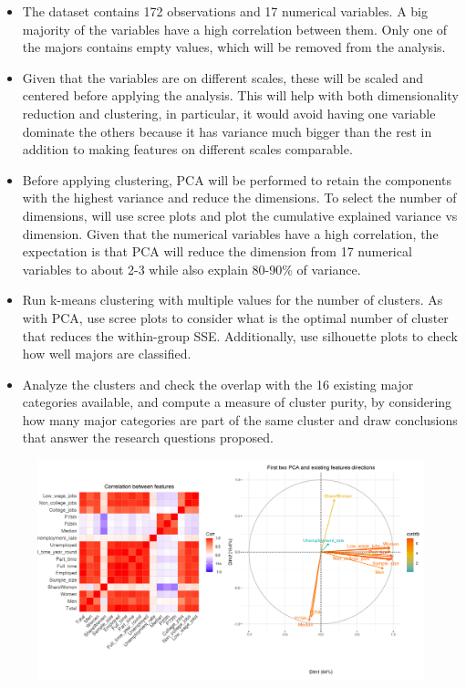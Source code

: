 \documentclass[11pt,a4paper]{article}
\begin{document}
\begin{itemize}
    \item The dataset contains 172 observations and 17 numerical variables. A big majority of the variables have a high correlation between them. Only one of the majors contains empty values, which will be removed from the analysis.
    \item Given that the variables are on different scales, these will be scaled and centered before applying the analysis. This will help with both dimensionality reduction and clustering, in particular, it would avoid having one variable dominate the others because it has variance much bigger than the rest in addition to making features on different scales comparable.
    \item Before applying clustering, PCA will be performed to retain the components with the highest variance and reduce the dimensions. To select the number of dimensions, will use scree plots and plot the cumulative explained variance vs dimension. Given that the numerical variables have a high correlation, the expectation is that PCA will reduce the dimension from 17 numerical variables to about 2-3 while also explain 80-90\% of variance.
    \item Run k-means clustering with multiple values for the number of clusters. As with PCA, use scree plots to consider what is the optimal number of cluster that reduces the within-group SSE. Additionally, use silhouette plots to check how well majors are classified.
    \item Analyze the clusters and check the overlap with the 16 existing major categories available, and compute a measure of cluster purity, by considering how many major categories are part of the same cluster and draw conclusions that answer the research questions proposed.
\end{itemize}

\begin{figure} [H]
    \begin{center}
        \includegraphics[scale=1, width=18cm]{plots.png}
        \label{fig:sampledvsdata}
    \end{center}
\end{figure}
\end{document}
